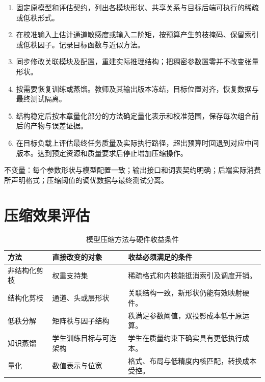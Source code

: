 \documentclass[../textbook.tex]{subfiles}
\begin{document}
\begin{algorithm}[按误差与执行约束构建压缩产物]
\begin{enumerate}
\item 固定原模型和评估契约，列出各模块形状、共享关系与目标后端可执行的稀疏或低秩形式。
\item 在校准输入上估计通道敏感度或输入二阶矩，按预算产生剪枝掩码、保留索引或低秩因子。记录目标函数与近似方法。
\item 同步修改关联模块及配置，重建实际推理结构；把稠密参数置零并不改变张量形状。
\item 按需要恢复训练或蒸馏。教师及其输出版本冻结，目标位置对齐，恢复数据与最终测试隔离。
\item 结构稳定后按本章量化部分的方法确定量化表示和校准范围，保存每次组合前后的产物与误差证据。
\item 在目标负载上评估最终任务质量及实际执行路径，超出预算时回退到对应中间版本。达到预定资源和质量要求后停止增加压缩操作。
\end{enumerate}
不变量：每个参数形状与模型配置一致；输出接口和词表契约明确；后端实际消费所声明格式；压缩阈值的调优数据与最终测试分离。
\end{algorithm}

\section{压缩效果评估}

\begin{table}[htbp]
\centering
\caption{模型压缩方法与硬件收益条件}\label{tab:optimization-hardware-conditions}
\begin{tabularx}{\linewidth}{@{}lXX@{}}
\toprule
方法 & 直接改变的对象 & 收益必须满足的条件\\
\midrule
非结构化剪枝 & 权重支持集 & 稀疏格式和内核能抵消索引及调度开销。\\
结构化剪枝 & 通道、头或层形状 & 关联结构一致，新形状仍能有效映射硬件。\\
低秩分解 & 矩阵秩与因子结构 & 秩满足参数阈值，双投影成本低于原运算。\\
知识蒸馏 & 学生训练目标与可选架构 & 学生在质量约束下确实具有更低执行成本。\\
量化 & 数值表示与位宽 & 格式、布局与低精度内核匹配，转换成本受控。\\
\bottomrule
\end{tabularx}
\end{table}
\end{document}
